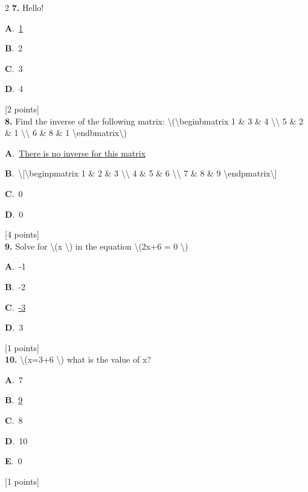 \documentclass[12pt]{article}
\newcommand{\choice}[3]{%
  \noindent\textbf{#1}.~#2\hfill#3\par\vspace{0.25em}
}
\begin{document}
\begin{multicols}{2}
\noindent \textbf{\textenglish{7.}} {\textenglish{Hello!}}

\noindent\choice{A}{\underline{{\textenglish{1}}}}{}
\noindent\choice{B}{{\textenglish{2}}}{}
\noindent\choice{C}{{\textenglish{3}}}{}
\noindent\choice{D}{{\textenglish{4}}}{}
\hfill {\textenglish{[2 points]}}\\[0.5em]

\noindent \textbf{\textenglish{8.}} {\textenglish{Find the inverse of the following matrix: \textbackslash{}(\textbackslash{}begin{bmatrix} 1 \& 3 \& 4 \textbackslash{}\textbackslash{} 5 \& 2 \& 1 \textbackslash{}\textbackslash{} 6 \& 8 \& 1 \textbackslash{}end{bmatrix}\textbackslash{})}}

\noindent\choice{A}{\underline{{\textenglish{There is no inverse for this matrix}}}}{}
\noindent\choice{B}{{\textenglish{\textbackslash{}[\textbackslash{}begin{pmatrix} 1 \& 2 \& 3 \textbackslash{}\textbackslash{} 4 \& 5 \& 6 \textbackslash{}\textbackslash{} 7 \& 8 \& 9  \textbackslash{}end{pmatrix}\textbackslash{}]}}}{}
\noindent\choice{C}{{\textenglish{0}}}{}
\noindent\choice{D}{{\textenglish{0}}}{}
\hfill {\textenglish{[4 points]}}\\[0.5em]

\noindent \textbf{\textenglish{9.}} {\textenglish{Solve for \textbackslash{}(x \textbackslash{}) in the equation \textbackslash{}(2x+6 = 0 \textbackslash{})}}

\noindent\choice{A}{{\textenglish{-1}}}{}
\noindent\choice{B}{{\textenglish{-2}}}{}
\noindent\choice{C}{\underline{{\textenglish{-3}}}}{}
\noindent\choice{D}{{\textenglish{3}}}{}
\hfill {\textenglish{[1 points]}}\\[0.5em]

\noindent \textbf{\textenglish{10.}} {\textenglish{\textbackslash{}(x=3+6 \textbackslash{}) what is the value of x?}}

\noindent\choice{A}{{\textenglish{7}}}{}
\noindent\choice{B}{\underline{{\textenglish{9}}}}{}
\noindent\choice{C}{{\textenglish{8}}}{}
\noindent\choice{D}{{\textenglish{10}}}{}
\noindent\choice{E}{{\textenglish{0}}}{}
\hfill {\textenglish{[1 points]}}\\[0.5em]


\end{multicols}
\end{document}
